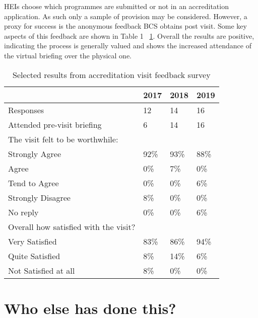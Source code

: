 \documentclass[sigconf]{acmart}
\begin{document}
HEIs choose which programmes are submitted or not in an accreditation application. As such only a sample of provision may be considered. However, a proxy for success is the anonymous feedback BCS obtains post visit. Some key aspects of this feedback are shown in Table 1 ~\ref{table:1}. Overall the results are positive, indicating the process is generally valued and shows the increased attendance of the virtual briefing over the physical one.

\begin{table}[h!]
  \caption{Selected results from accreditation visit feedback survey}
  \label{table:1}
\begin{tabular}{ | p{5cm}|p{.75cm}|p{.75cm} |p{.75cm} |}
\hline
 & 2017 & 2018 & 2019   \\ \hline
Responses & 12 & 14 & 16   \\
\hline
Attended pre-visit briefing & 6 & 14 & 16   \\
\hline
The visit felt to be worthwhile: & & &  \\
Strongly Agree &92\% & 93\% &88\% \\
Agree &0\% & 7\% &0\% \\
Tend to Agree &0\% & 0\% &6\% \\
Strongly Disagree &8\% & 0\% &0\% \\
No reply &0\% & 0\% &6\% \\
\hline
Overall how satisfied with the visit? & & &  \\
Very Satisfied &83\% & 86\% &94\% \\
Quite Satisfied &8\% & 14\% &6\% \\
Not Satisfied at all &8\% & 0\% &0\% \\
\hline

\end{tabular}%
\end{table}

\section {Who else has done this?}	
\end{document}
